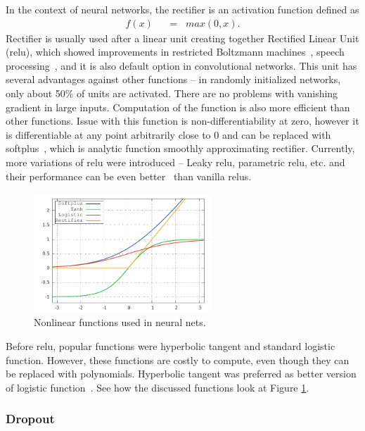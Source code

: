 In the context of neural networks, the rectifier is an activation function defined as
\begin{align}
f(x) \hspace{7pt}&=\hspace{7pt} max(0,x). \label{eq:rectifier}
\end{align}
Rectifier is usually used after a linear unit creating together Rectified Linear Unit (\gls{relu}), which showed improvements in restricted Boltzmann machines~\cite{DBLP:conf/icml/NairH10}, speech processing~\cite{zeiler2013rectified}, and it is also default option in convolutional networks. This unit has several advantages against other functions -- in randomly initialized networks, only about 50\% of units are activated. There are no problems with vanishing gradient in large inputs. Computation of the function is also more efficient than other functions. Issue with this function is non-differentiability at zero, however it is differentiable at any point arbitrarily close to 0 and can be replaced with softplus~\cite{dugas2001incorporating}, which is analytic function smoothly approximating rectifier. Currently, more variations of \gls{relu} were introduced -- Leaky \gls{relu}, parametric \gls{relu}, etc. and their performance can be even better~\cite{DBLP:journals/corr/XuWCL15} than vanilla \gls{relu}s.

\begin{figure}[!t]
	\centering
	\includegraphics[width=0.6\textwidth]{fig/nonlinearities.pdf}
	\caption{Nonlinear functions used in neural nets.
		\label{fig:nonlinear}}
\end{figure}
Before \gls{relu}, popular functions were hyperbolic tangent and standard logistic function. However, these functions are costly to compute, even though they can be replaced with polynomials. Hyperbolic tangent was preferred as better version of logistic function~\cite{lecun2012efficient}. See how the discussed functions look at Figure \ref{fig:nonlinear}.

\subsubsection{Dropout}

